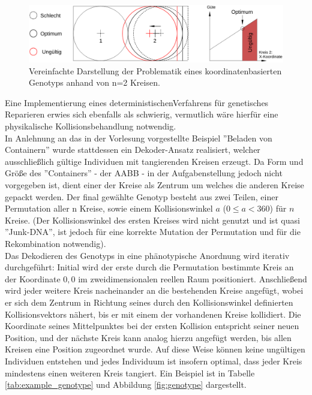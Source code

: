 \documentclass[twoside,bibtotoc]{report}
\begin{document}
\begin{figure}[h]
 \centering
 \includegraphics [width=\textwidth]{Bilder/2.png}
 \caption{
 	Vereinfachte Darstellung der Problematik eines koordinatenbasierten
 	Genotyps anhand von n=2 Kreisen.
 	}
 \label{fig:wrong_genotype}
\end{figure}

Eine Implementierung eines deterministischenVerfahrens für genetisches Reparieren erwies sich ebenfalls als schwierig, vermutlich wäre hierfür eine physikalische Kollisionsbehandlung notwendig.\\

In Anlehnung an das in der Vorlesung vorgestellte Beispiel ''Beladen von Containern'' wurde stattdessen ein Dekoder-Ansatz realisiert, welcher ausschließlich gültige Individuen mit tangierenden Kreisen erzeugt.
Da Form und Größe des ''Containers'' - der \gls{AABB} - in der Aufgabenstellung jedoch nicht vorgegeben ist, dient einer der Kreise als Zentrum um welches die anderen Kreise gepackt werden.
Der final gewählte Genotyp besteht aus zwei Teilen, einer Permutation aller n Kreise, sowie einem Kollisionswinkel $a$ ($0 \leq a < 360$) für $n$ Kreise.
(Der Kollisionswinkel des ersten Kreises wird nicht genutzt und ist quasi ''Junk-DNA'', ist jedoch für eine korrekte Mutation der Permutation und für die Rekombination notwendig).\\

Das Dekodieren des Genotyps in eine phänotypische Anordnung wird iterativ durchgeführt:
Initial wird der erste durch die Permutation bestimmte Kreis an der Koordinate $0,0$ im zweidimensionalen reellen Raum positioniert.
Anschließend wird jeder weitere Kreis nacheinander an die bestehenden Kreise angefügt, wobei er sich dem Zentrum in Richtung seines durch den Kollisionswinkel definierten Kollisionsvektors nähert, bis er mit einem der vorhandenen Kreise kollidiert.
Die Koordinate seines Mittelpunktes bei der ersten Kollision entspricht seiner neuen Position, und der nächste Kreis kann analog hierzu angefügt werden, bis allen Kreisen eine Position zugeordnet wurde.
Auf diese Weise können keine ungültigen Individuen entstehen und jedes Individuum ist insofern optimal, dass jeder Kreis mindestens einen weiteren Kreis tangiert.
Ein Beispiel ist in Tabelle \ref{tab:example_genotype} und Abbildung \ref{fig:genotype} dargestellt.\\
\end{document}
